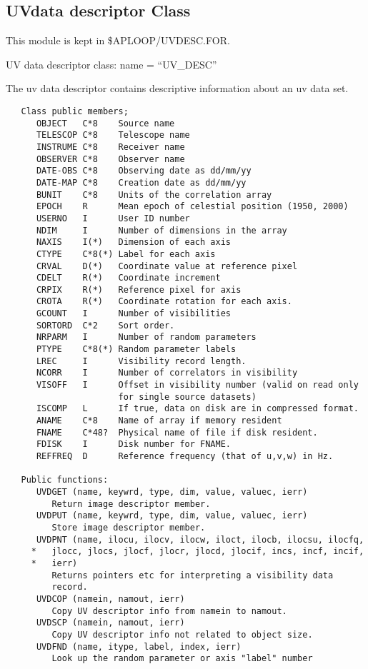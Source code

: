 \subsection{UVdata descriptor Class}

   This module is kept in \$APLOOP/UVDESC.FOR.

   UV data descriptor class: name = ``UV\_DESC''

   The uv data descriptor contains descriptive information about an
uv data set.

{\small\begin{verbatim}
   Class public members;
      OBJECT   C*8    Source name
      TELESCOP C*8    Telescope name
      INSTRUME C*8    Receiver name
      OBSERVER C*8    Observer name
      DATE-OBS C*8    Observing date as dd/mm/yy
      DATE-MAP C*8    Creation date as dd/mm/yy
      BUNIT    C*8    Units of the correlation array
      EPOCH    R      Mean epoch of celestial position (1950, 2000)
      USERNO   I      User ID number
      NDIM     I      Number of dimensions in the array
      NAXIS    I(*)   Dimension of each axis
      CTYPE    C*8(*) Label for each axis
      CRVAL    D(*)   Coordinate value at reference pixel
      CDELT    R(*)   Coordinate increment
      CRPIX    R(*)   Reference pixel for axis
      CROTA    R(*)   Coordinate rotation for each axis.
      GCOUNT   I      Number of visibilities
      SORTORD  C*2    Sort order.
      NRPARM   I      Number of random parameters
      PTYPE    C*8(*) Random parameter labels
      LREC     I      Visibility record length.
      NCORR    I      Number of correlators in visibility
      VISOFF   I      Offset in visibility number (valid on read only
                      for single source datasets)
      ISCOMP   L      If true, data on disk are in compressed format.
      ANAME    C*8    Name of array if memory resident
      FNAME    C*48?  Physical name of file if disk resident.
      FDISK    I      Disk number for FNAME.
      REFFREQ  D      Reference frequency (that of u,v,w) in Hz.

   Public functions:
      UVDGET (name, keywrd, type, dim, value, valuec, ierr)
         Return image descriptor member.
      UVDPUT (name, keywrd, type, dim, value, valuec, ierr)
         Store image descriptor member.
      UVDPNT (name, ilocu, ilocv, ilocw, iloct, ilocb, ilocsu, ilocfq,
     *   jlocc, jlocs, jlocf, jlocr, jlocd, jlocif, incs, incf, incif,
     *   ierr)
         Returns pointers etc for interpreting a visibility data
         record.
      UVDCOP (namein, namout, ierr)
         Copy UV descriptor info from namein to namout.
      UVDSCP (namein, namout, ierr)
         Copy UV descriptor info not related to object size.
      UVDFND (name, itype, label, index, ierr)
         Look up the random parameter or axis "label" number
\end{verbatim}}

